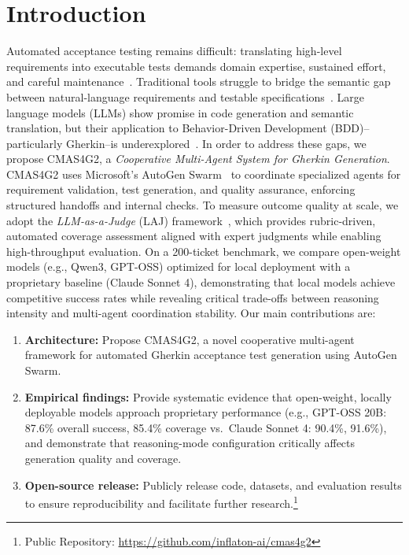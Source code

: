 \documentclass[runningheads]{llncs}
\begin{document}
\section{Introduction}
Automated acceptance testing remains difficult: translating high-level requirements into executable tests demands domain expertise, sustained effort, and careful maintenance~\cite{zhao2020nlp4re}. Traditional tools struggle to bridge the semantic gap between natural-language requirements and testable specifications~\cite{das2024extracting}. Large language models (LLMs) show promise in code generation and semantic translation, but their application to Behavior-Driven Development (BDD)--particularly Gherkin--is underexplored~\cite{wang2024effectiveness}.
In order to address these gaps, we propose CMAS4G2, a \emph{Cooperative Multi-Agent System for Gherkin Generation}. CMAS4G2 uses Microsoft's AutoGen Swarm~\cite{autogen_swarm_docs} to coordinate specialized agents for requirement validation, test generation, and quality assurance, enforcing structured handoffs and internal checks. To measure outcome quality at scale, we adopt the \emph{LLM-as-a-Judge} (LAJ) framework~\cite{huang2025laj}, which provides rubric-driven, automated coverage assessment aligned with expert judgments while enabling high-throughput evaluation. On a 200-ticket benchmark, we compare open-weight models (e.g., Qwen3, GPT-OSS) optimized for local deployment with a proprietary baseline (Claude Sonnet 4), demonstrating that local models achieve competitive success rates while revealing critical trade-offs between reasoning intensity and multi-agent coordination stability.
Our main contributions are:
\begin{enumerate}
  \item \textbf{Architecture:} Propose CMAS4G2, a novel cooperative multi-agent framework for automated Gherkin acceptance test generation using AutoGen Swarm.
  \item \textbf{Empirical findings:} Provide systematic evidence that open-weight, locally deployable models approach proprietary performance (e.g., GPT-OSS 20B: 87.6\% overall success, 85.4\% coverage vs.\ Claude Sonnet 4: 90.4\%, 91.6\%), and demonstrate that reasoning-mode configuration critically affects generation quality and coverage.
  \item \textbf{Open-source release:} Publicly release code, datasets, and evaluation results to ensure reproducibility and facilitate further research.\footnote{Public Repository: \url{https://github.com/inflaton-ai/cmas4g2}}
\end{enumerate}
\end{document}
